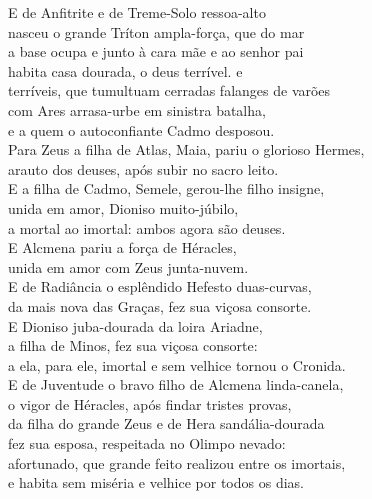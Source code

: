 \begin{pages}
\begin{Rightside}
\quad{}E de Anfitrite e de Treme-Solo ressoa-alto \\
nasceu o grande Tríton ampla-força, que do mar\\
a base ocupa e junto à cara mãe e ao senhor pai\\
habita casa dourada, o deus terrível.   e \\
terríveis, que tumultuam cerradas falanges de varões \\
com Ares arrasa-urbe em sinistra batalha,\\
e  a quem o autoconfiante Cadmo desposou.\\

\quad{}Para Zeus a filha de Atlas, Maia, pariu o glorioso Hermes,\\
arauto dos deuses, após subir no sacro leito.\\

\quad{}E a filha de Cadmo, Semele, gerou-lhe filho insigne, \\
unida em amor, Dioniso muito-júbilo,\\
a mortal ao imortal: ambos agora são deuses.\\

\quad{}E Alcmena pariu a força de Héracles,\\
unida em amor com Zeus junta-nuvem.\\

\quad{}E de Radiância o esplêndido Hefesto duas-curvas, \\
da mais nova das Graças, fez sua viçosa consorte.\\

\quad{}E Dioniso juba-dourada da loira Ariadne,\\
a filha de Minos, fez sua viçosa consorte:\\
a ela, para ele, imortal e sem velhice tornou o Cronida.\\

\quad{}E de Juventude o bravo filho de Alcmena linda-canela, \\
o vigor de Héracles, após findar tristes provas,\\
da filha do grande Zeus e de Hera sandália-dourada\\
fez sua esposa, respeitada no Olimpo nevado:\\
afortunado, que grande feito realizou entre os imortais,\\
e habita sem miséria e velhice por todos os dias. \\


\end{Rightside}
\end{pages}

